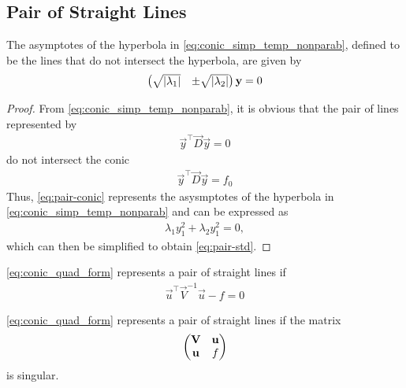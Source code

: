 \documentclass[journal,12pt,onecolumn]{IEEEtran}
\begin{document}
\subsection{Pair of Straight Lines}
\begin{lemma}[Asymptotes]
	The asymptotes of the hyperbola in 
    \eqref{eq:conic_simp_temp_nonparab}, defined to be the lines that do not intersect the hyperbola, are given by 
    \begin{align} 
    \label{eq:pair-std}
    \begin{pmatrix}\sqrt{\left\vert\lambda_1\right\vert} & \pm \sqrt{\left\vert\lambda_2\right\vert}\end{pmatrix}\mathbf{y} = 0
    \end{align} 
  \end{lemma}
  \begin{proof}
	  From 
\eqref{eq:conic_simp_temp_nonparab},
it is obvious that 
the pair of lines represented by 
  \begin{align}
	    \vec{y}^{\top}\vec{D}\vec{y} = 0   
      \label{eq:pair-conic}
  \end{align}
  do not intersect the conic 
  \begin{align}
	    \vec{y}^{\top}\vec{D}\vec{y} =  f_0  
  \end{align}
  Thus, 
      \eqref{eq:pair-conic}
      represents the asysmptotes of the hyperbola in 
\eqref{eq:conic_simp_temp_nonparab} and can be expressed as 
  \begin{align} 
    \lambda_1y_1^2 +\lambda_2y_1^2 = 0, 
    \label{eq:quad_form_hyper}
    \end{align}
which can then be simplified to obtain 
    \eqref{eq:pair-std}.

  \end{proof}
  \begin{corollary}
\eqref{eq:conic_quad_form} represents a pair of straight lines if 
  \begin{align} 
	  \label{eq:pair-cond}
  \vec{u}^{\top}\vec{V}^{-1}\vec{u} -f  = 0
  \end{align} 
  \end{corollary}
  \begin{theorem}
	  \label{them:pair-mat-sing}
\eqref{eq:conic_quad_form} represents a pair of straight lines if 
the matrix 
  \begin{align} 
	  \begin{pmatrix}\mathbf{V} & \mathbf{u}\\ \mathbf{u} & f\end{pmatrix}  
	  \label{eq:pair-mat-sing}
  \end{align} 
  is singular.
  \end{theorem}
\end{document}
